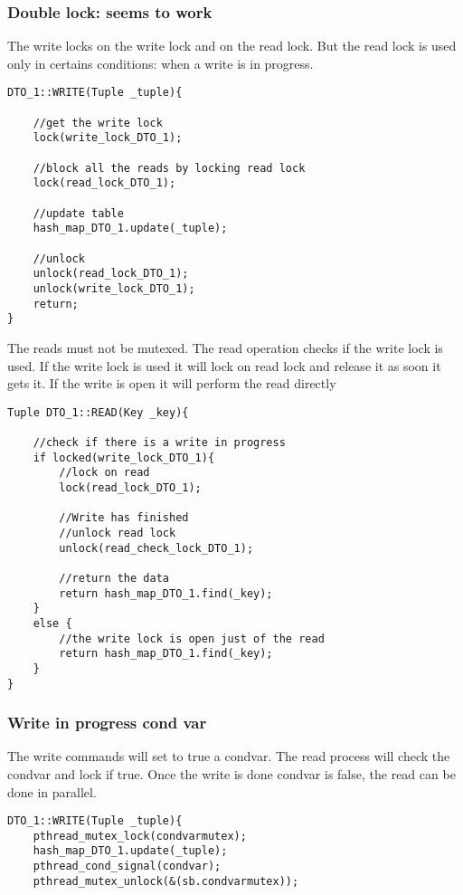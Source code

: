 \documentclass[a4paper]{article}
\begin{document}
\subsubsection{Double lock: seems to work}
The write locks on the write lock and on the read lock. But the read lock is
used only in certains conditions: when a write is in progress.

\begin{verbatim}
DTO_1::WRITE(Tuple _tuple){

    //get the write lock
    lock(write_lock_DTO_1);
    
    //block all the reads by locking read lock
    lock(read_lock_DTO_1);
    
    //update table
    hash_map_DTO_1.update(_tuple);
    
    //unlock 
    unlock(read_lock_DTO_1);
    unlock(write_lock_DTO_1); 
    return;
}
\end{verbatim}

The reads must not be mutexed.
The read operation checks if the write lock is used. If the write lock is used
it will lock on read lock and release it as soon it gets it.
If the write is open it will perform the read directly

\begin{verbatim}
Tuple DTO_1::READ(Key _key){

    //check if there is a write in progress
    if locked(write_lock_DTO_1){
        //lock on read
        lock(read_lock_DTO_1);     
        
        //Write has finished   
        //unlock read lock
        unlock(read_check_lock_DTO_1);
       
        //return the data
        return hash_map_DTO_1.find(_key);
    }
    else {
        //the write lock is open just of the read
        return hash_map_DTO_1.find(_key);
    }
}
\end{verbatim}


\subsubsection{Write in progress cond var}
The write commands will set to true a condvar. The read process will check the
condvar and lock if true.
Once the write is done condvar is false, the read can be done in parallel.

\begin{verbatim}
DTO_1::WRITE(Tuple _tuple){
    pthread_mutex_lock(condvarmutex);
    hash_map_DTO_1.update(_tuple);
    pthread_cond_signal(condvar);
    pthread_mutex_unlock(&(sb.condvarmutex));
\end{verbatim}
\end{document}
